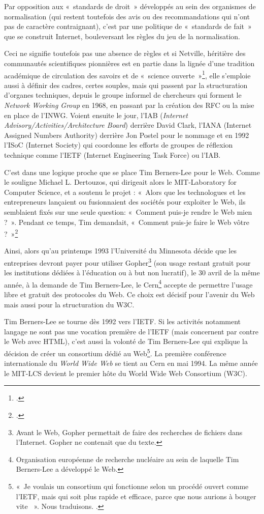 \documentclass{FramateX}
\begin{document}
\begin{refsection}
Par opposition aux «~standards de droit~» développés au sein des organismes de normalisation (qui restent toutefois des avis ou des recommandations qui n'ont pas de caractère
contraignant), c'est par une politique de «~standards
de fait~» que se construit Internet, bouleversant les règles du jeu de la normalisation.

Ceci ne signifie toutefois pas une absence de règles et si Netville,
héritière des communautés scientifiques pionnières est en partie dans
la lignée d'une tradition académique de circulation
des savoirs et de «~science ouverte~»\footnote{\cite{King1997}.},
elle s'emploie aussi à définir des cadres, certes
souples, mais qui passent par la structuration
d'organes techniques, depuis le groupe informel de
chercheurs qui forment le \textit{Network Working Group} en 1968, en
passant par la création des RFC ou la mise en place de
l'INWG. Voient ensuite le jour, l'IAB
(\textit{Internet Advisory/Activities/Architecture Board}) derrière
David Clark, l'IANA (Internet Assigned Numbers
Authority) derrière Jon Postel pour le nommage et en 1992
l'ISoC (Internet Society) qui
coordonne les efforts de groupes de réflexion technique comme
l'IETF (Internet Engineering Task Force) ou
l'IAB.


C'est dans une logique proche que se place Tim
Berners-Lee pour le Web. Comme le souligne Michael L. Dertouzos, qui
dirigeait alors le MIT-Laboratory for Computer Science, et a
soutenu le projet : «~Alors que les technologues et les entrepreneurs
lançaient ou fusionnaient des sociétés pour exploiter le Web, ils
semblaient fixés sur une seule question: «~Comment puis-je rendre le
Web mien ?~». Pendant ce temps, Tim demandait, «~Comment puis-je faire le Web vôtre ?~»\footnote{\cite[p.~viii]{berners-leeweaving2000}.}

Ainsi, alors qu'au printemps 1993
l'Université du Minnesota décide que les entreprises
devront payer pour utiliser Gopher\footnote{Avant le Web, Gopher
permettait de faire des recherches de fichiers dans
l'Internet. Gopher ne contenait que du texte.} (son
usage restant gratuit pour les institutions dédiées à
l'éducation ou à but non lucratif), le 30 avril de la
même année, à la demande de Tim Berners-Lee, le
Cern\footnote{Organisation européenne de recherche nucléaire au sein de
laquelle Tim Berners-Lee a développé le Web.} accepte de permettre
l'usage libre et gratuit des protocoles du Web. Ce
choix est décisif pour l'avenir du Web mais aussi pour
la structuration du W3C. 

Tim Berners-Lee se tourne dès 1992 vers l'IETF. Si les activités notamment
langage ne sont pas une vocation première de l'IETF
(mais concernent par contre le Web avec HTML), c'est
aussi la volonté de Tim Berners-Lee qui explique la décision de créer
un consortium dédié au Web\footnote{«~Je voulais un
consortium qui fonctionne selon un procédé ouvert comme
l'IETF, mais qui soit plus rapide et efficace, parce
que nous aurions à bouger vite ~». Nous traduisons. \cite[p.~92]{berners-leeweaving2000}.}. La première
conférence internationale du \textit{World Wide Web} se tient au Cern
en mai 1994. La même année le MIT-LCS devient le premier hôte du World Wide Web Consortium (W3C). 


\end{refsection}
\end{document}
